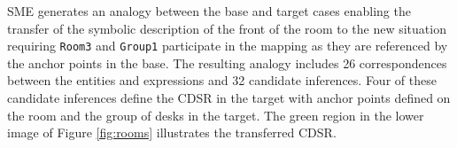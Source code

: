 \documentclass[letterpaper]{article}
\newcommand{\fw}[1]{\texttt{#1}}
\begin{document}
SME generates an analogy between the base and target cases enabling the transfer of the symbolic description of the front of the room to the new situation requiring \fw{Room3} and \fw{Group1} participate in the mapping as they are referenced by the anchor points in the base. The resulting analogy includes 26 correspondences between the entities and expressions and 32 candidate inferences. Four of these candidate inferences define the CDSR in the target with anchor points defined on the room and the group of desks in the target. The green region in the lower image of Figure \ref{fig:rooms} illustrates the transferred CDSR.



%
% 
\end{document}

